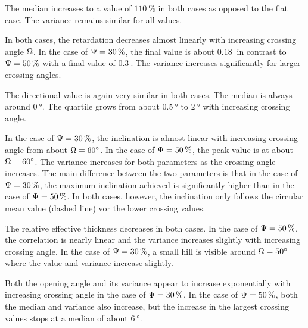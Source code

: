 The median increases to a value of $\SI{110}{\percent}$ in both cases as opposed to the flat case.
The variance remains similar for all values.
\par
In both cases, the retardation decreases almost linearly with increasing crossing angle $\textnormal{$\Omega$}$.
In the case of $\textnormal{$\Psi$} = \SI{30}{\percent}$, the final value is about $\SI{0.18}{}$ in contrast to $\textnormal{$\Psi$} = \SI{50}{\percent}$ with a final value of $\SI{0.3}{}$.
The variance increases significantly for larger crossing angles.
\par
The directional value is again very similar in both cases.
The median is always around $\SI{0}{\degree}$.
The quartile grows from about $\SI{0.5}{\degree}$ to $\SI{2}{\degree}$ with increasing crossing angle.
\par
In the case of $\textnormal{$\Psi$} = \SI{30}{\percent}$, the inclination is almost linear with increasing crossing angle from about $\textnormal{$\Omega$} =\SI{60}{\degree}$.
In the case of $\textnormal{$\Psi$} = \SI{50}{\percent}$, the peak value is at about $\textnormal{$\Omega$} = \SI{60}{\degree}$.
The variance increases for both parameters as the crossing angle increases.
The main difference between the two parameters is that in the case of $\textnormal{$\Psi$} = \SI{30}{\percent}$, the maximum inclination achieved is significantly higher than in the case of $\textnormal{$\Psi$} = \SI{50}{\percent}$.
In both cases, however, the inclination only follows the circular mean value (dashed line) vor the lower crossing values.
\par
The relative effective thickness \trel{} decreases in both cases.
In the case of $\textnormal{$\Psi$} = \SI{50}{\percent}$, the correlation is nearly linear and the variance increases slightly with increasing crossing angle.
In the case of $\textnormal{$\Psi$} = \SI{30}{\percent}$, a small hill is visible around $\textnormal{$\Omega$} = \SI{50}{\degree}$ where the value and variance increase slightly.
\par
Both the opening angle and its variance appear to increase exponentially with increasing crossing angle in the case of $\textnormal{$\Psi$} = \SI{30}{\percent}$.
In the case of $\textnormal{$\Psi$} = \SI{50}{\percent}$, both the median and variance also increase, but the increase in the largest crossing values stops at a median of about $\SI{6}{\degree}$.
%
